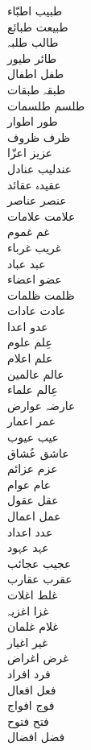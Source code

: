 \documentclass[a4paper]{article}
\begin{document}
\begin{multicols}{3}
\begin{tabbing}
طبیب \> اطبّاء\\
طبیعت \> طبائع\\
طالب \> طلبہ\\
طائر \> طیور\\
طفل \> اطفال\\
طبقہ \> طبقات\\
طلسم \> طلسمات\\
طور \> اطوار\\
ظرف \> ظروف\\
عزیز \> اعزّا\\
عندلیب \> عنادل\\
عقیدہ \> عقائد\\
عنصر \> عناصر\\
علامت \> علامات\\
غم \> غموم\\
غریب \> غرباء\\
عبد \> عباد\\
عضو \> اعضاء\\
ظلمت \> ظلمات\\
عادت \> عادات\\
عدو \> اعدا\\
عِلم \> علوم\\
علم \> اعلام\\
عالم \> عالمین\\
عِالم \> علماء\\
عارضہ \> عوارض\\
عمر \> اعمار\\
عیب \> عیوب\\
عاشق \> عُشاق\\
عزم \> عزائم\\
عام \> عوام\\
عقل \> عقول\\
عمل \> اعمال\\
عدد \> اعداد\\
عہد \> عہود\\
عجیب \> عجائب\\
عقرب \> عقارب\\
غلط \> اغلات\\
غزا \> اغزیہ\\
غلام \> غلمان\\
غیر \> اغیار\\
غرض \> اغراض\\
فرد \> افراد\\
فعل \> افعال\\
فوج \> افواج\\
فتح \> فتوح\\
فضل \> افضال\\

\end{tabbing}
\end{multicols}
\end{document}
